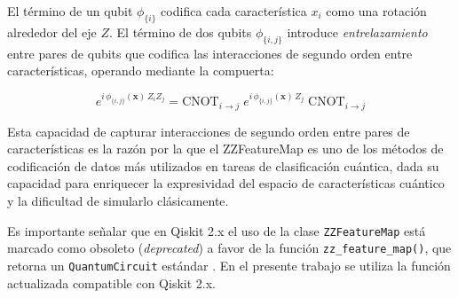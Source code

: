 \noindent El término de un qubit $\phi_{\{i\}}$ codifica
cada característica $x_i$ como una rotación alrededor del
eje $Z$. El término de dos qubits $\phi_{\{i,j\}}$
introduce \textit{entrelazamiento} entre pares de qubits
que codifica las interacciones de segundo orden entre
características, operando mediante la compuerta:

\begin{equation}
  e^{i\,\phi_{\{i,j\}}(\mathbf{x})\,Z_i Z_j} =
  \text{CNOT}_{i \to j}\;
  e^{i\,\phi_{\{i,j\}}(\mathbf{x})\,Z_j}\;
  \text{CNOT}_{i \to j}
  \label{eq:zz_gate}
\end{equation}

\noindent Esta capacidad de capturar interacciones de segundo
orden entre pares de características es la razón por la que
el ZZFeatureMap es uno de los métodos
de codificación de datos más utilizados en tareas de
clasificación cuántica, dada su capacidad para enriquecer la
expresividad del espacio de características cuántico y la
dificultad de simularlo clásicamente. 

Es importante señalar que en Qiskit 2.x el uso de la clase
\texttt{ZZFeatureMap} está marcado como obsoleto
(\textit{deprecated}) a favor de la función
\texttt{zz\_feature\_map()}, que retorna un
\texttt{QuantumCircuit} estándar \cite{ibmquantum2024docs}.
En el presente trabajo se utiliza la función actualizada
compatible con Qiskit 2.x.
